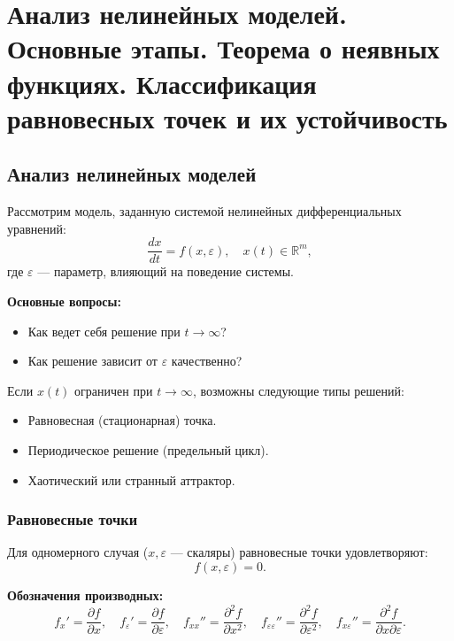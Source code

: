 	\section{Анализ нелинейных моделей. Основные этапы. Теорема о неявных функциях. Классификация равновесных точек и их устойчивость}
	
	
	\subsection{Анализ нелинейных моделей}
	
	Рассмотрим модель, заданную системой нелинейных дифференциальных уравнений:
	\begin{equation}
		\frac{d x}{d t} = f(x, \varepsilon), \quad x(t) \in \mathbb{R}^m,
	\end{equation}
	где \(\varepsilon\) — параметр, влияющий на поведение системы.
	
	\textbf{Основные вопросы:}
	\begin{itemize}
		\item Как ведет себя решение при \( t \rightarrow \infty \)?
		\item Как решение зависит от \(\varepsilon\) качественно?
	\end{itemize}
	
	Если \(x(t)\) ограничен при \( t \rightarrow \infty \), возможны следующие типы решений:
	\begin{itemize}
		\item Равновесная (стационарная) точка.
		\item Периодическое решение (предельный цикл).
		\item Хаотический или странный аттрактор.
	\end{itemize}
	
	\subsubsection{Равновесные точки}
	
	Для одномерного случая (\(x, \varepsilon\) — скаляры) равновесные точки удовлетворяют:
	\begin{equation}
		f(x, \varepsilon) = 0.
	\end{equation}
	
	\textbf{Обозначения производных:}
	\begin{equation}
		f_x' = \frac{\partial f}{\partial x}, \quad f_\varepsilon' = \frac{\partial f}{\partial \varepsilon}, \quad f_{xx}'' = \frac{\partial^2 f}{\partial x^2}, \quad f_{\varepsilon\varepsilon}'' = \frac{\partial^2 f}{\partial \varepsilon^2}, \quad f_{x\varepsilon}'' = \frac{\partial^2 f}{\partial x \partial \varepsilon}.
	\end{equation}
	
